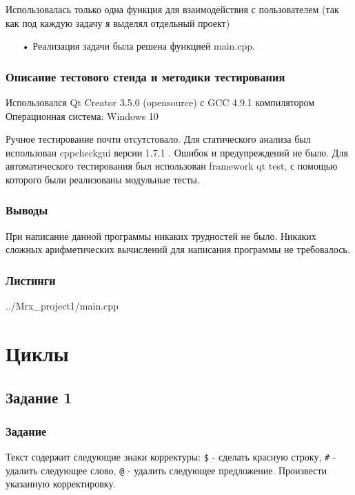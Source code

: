 \documentclass[12pt,a4paper]{report}
\begin{document}
Использовалась только одна функция для взаимодействия с пользователем (так как под каждую задачу я выделял отдельный проект)
\begin{enumerate}
\item[•]  Реализация задачи была решена функцией main.cpp.
\end{enumerate}

\subsection{Описание тестового стенда и методики тестирования}

Использовался Qt Creator 3.5.0 (opensource) с GCC 4.9.1 компилятором
Операционная система: Windows 10


Ручное тестирование почти отсутстовало.
Для статического анализа был использован cppcheckgui версии 1.7.1 . Ошибок и предупреждений не было.
Для автоматического тестирования был использован framework qt test, с помощью которого были реализованы модульные тесты.


\subsection{Выводы}

При написание данной программы никаких трудностей не было. Никаких сложных арифметических вычислений для написания программы не требовалось.

\subsection*{Листинги}

{../Mrx_project1/main.cpp}

\chapter{Циклы}
\section{Задание 1}
\subsection{Задание}

Текст содержит следующие знаки корректуры: \verb-$- - сделать красную строку, \verb-#- - удалить следующее слово, \verb-@- - удалить следующее предложение. Произвести указанную корректировку.
\end{document}
